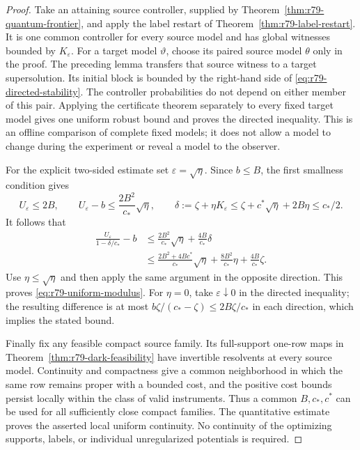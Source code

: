 \begin{proof}
Take an attaining source controller, supplied by
Theorem~\ref{thm:r79-quantum-frontier}, and apply the label restart
of Theorem~\ref{thm:r79-label-restart}.  It is one common controller
for every source model and has global witnesses bounded by
$K_\varepsilon$.  For a target model $\vartheta$, choose its
paired source model $\theta$ only in the proof.  The preceding
lemma transfers that source witness to a target supersolution.
Its initial block is bounded by the right-hand side of
\eqref{eq:r79-directed-stability}.  The controller probabilities
do not depend on either member of this pair.  Applying the
certificate theorem separately to every fixed target model gives
one uniform robust bound and proves the directed inequality.
This is an offline comparison of complete fixed models; it does
not allow a model to change during the experiment or reveal a
model to the observer.

For the explicit two-sided estimate set $\varepsilon=\sqrt\eta$.
Since $b\le B$, the first smallness condition gives
\[
 U_\varepsilon\le2B,
 \qquad U_\varepsilon-b\le\frac{2B^2}{c_*}\sqrt\eta,
 \qquad
 \delta:=\zeta+\eta K_\varepsilon
       \le\zeta+c^*\sqrt\eta+2B\eta\le c_*/2.
\]
It follows that
\begin{align*}
 \frac{U_\varepsilon}{1-\delta/c_*}-b
 &\le\frac{2B^2}{c_*}\sqrt\eta
                       +\frac{4B}{c_*}\delta\\
 &\le\frac{2B^2+4Bc^*}{c_*}\sqrt\eta
          +\frac{8B^2}{c_*}\eta+\frac{4B}{c_*}\zeta.
\end{align*}
Use $\eta\le\sqrt\eta$ and then apply the same argument in the
opposite direction.  This proves
\eqref{eq:r79-uniform-modulus}.  For $\eta=0$, take
$\varepsilon\downarrow0$ in the directed inequality; the
resulting difference is at most
$b\zeta/(c_*-\zeta)\le2B\zeta/c_*$ in each direction, which
implies the stated bound.

Finally fix any feasible compact source family.  Its full-support
one-row maps in Theorem~\ref{thm:r79-dark-feasibility} have
invertible resolvents at every source model.  Continuity and
compactness give a common neighborhood in which the same row
remains proper with a bounded cost, and the positive cost bounds
persist locally within the class of valid instruments.  Thus a
common $B,c_*,c^*$ can be used for all sufficiently close compact
families.  The quantitative estimate proves the asserted local
uniform continuity.  No continuity of the optimizing supports,
labels, or individual unregularized potentials is required.
\end{proof}

